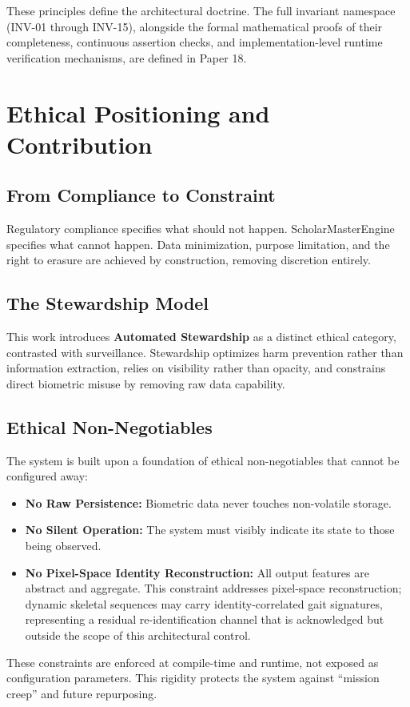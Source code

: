 \documentclass[conference]{IEEEtran}
\begin{document}
These principles define the architectural doctrine. The full invariant namespace (INV-01 through INV-15), alongside the formal mathematical proofs of their completeness, continuous assertion checks, and implementation-level runtime verification mechanisms, are defined in Paper 18.

\section{Ethical Positioning and Contribution}

\subsection{From Compliance to Constraint}
Regulatory compliance specifies what should not happen. ScholarMasterEngine specifies what cannot happen. Data minimization, purpose limitation, and the right to erasure are achieved by construction, removing discretion entirely.

\subsection{The Stewardship Model}
This work introduces \textbf{Automated Stewardship} as a distinct ethical category, contrasted with surveillance. Stewardship optimizes harm prevention rather than information extraction, relies on visibility rather than opacity, and constrains direct biometric misuse by removing raw data capability.

\subsection{Ethical Non-Negotiables}
The system is built upon a foundation of ethical non-negotiables that cannot be configured away:
\begin{itemize}
    \item \textbf{No Raw Persistence:} Biometric data never touches non-volatile storage.
    \item \textbf{No Silent Operation:} The system must visibly indicate its state to those being observed.
    \item \textbf{No Pixel-Space Identity Reconstruction:} All output features are abstract and aggregate. This constraint addresses pixel-space reconstruction; dynamic skeletal sequences may carry identity-correlated gait signatures, representing a residual re-identification channel that is acknowledged but outside the scope of this architectural control.
\end{itemize}
These constraints are enforced at compile-time and runtime, not exposed as configuration parameters. This rigidity protects the system against ``mission creep'' and future repurposing.
\end{document}

